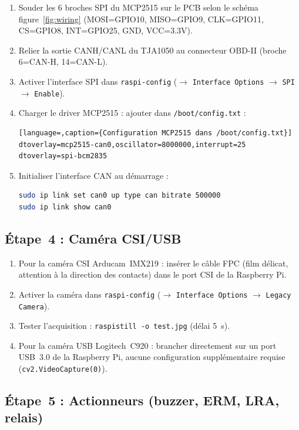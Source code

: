 \documentclass[12pt,a4paper]{report}
\begin{document}
\begin{enumerate}
  \item Souder les 6 broches SPI du MCP2515 sur le PCB selon le sch\'ema figure~\ref{fig:wiring} (MOSI=GPIO10, MISO=GPIO9, CLK=GPIO11, CS=GPIO8, INT=GPIO25, GND, VCC=3.3V).
  \item Relier la sortie CANH/CANL du TJA1050 au connecteur OBD-II (broche 6=CAN-H, 14=CAN-L).
  \item Activer l'interface SPI dans \texttt{raspi-config} ($\rightarrow$ \texttt{Interface Options} $\rightarrow$ \texttt{SPI} $\rightarrow$ \texttt{Enable}).
  \item Charger le driver MCP2515 : ajouter dans \texttt{/boot/config.txt} :
\begin{lstlisting}[language=,caption={Configuration MCP2515 dans /boot/config.txt}]
dtoverlay=mcp2515-can0,oscillator=8000000,interrupt=25
dtoverlay=spi-bcm2835
\end{lstlisting}
  \item Initialiser l'interface CAN au d\'emarrage :
\begin{lstlisting}[language=bash,caption={Initialisation du bus CAN sous Linux}]
sudo ip link set can0 up type can bitrate 500000
sudo ip link show can0
\end{lstlisting}
\end{enumerate}

\subsection{\'Etape~4 : Cam\'era CSI/USB}

\begin{enumerate}
  \item Pour la cam\'era CSI Arducam~IMX219 : ins\'erer le c\^able FPC (film d\'elicat, attention \`a la direction des contacts) dans le port CSI de la Raspberry Pi.
  \item Activer la cam\'era dans \texttt{raspi-config} ($\rightarrow$ \texttt{Interface Options} $\rightarrow$ \texttt{Legacy Camera}).
  \item Tester l'acquisition : \texttt{raspistill -o test.jpg} (d\'elai 5~s).
  \item Pour la cam\'era USB Logitech~C920 : brancher directement sur un port USB~3.0 de la Raspberry Pi, aucune configuration suppl\'ementaire requise (\texttt{cv2.VideoCapture(0)}).
\end{enumerate}

\subsection{\'Etape~5 : Actionneurs (buzzer, ERM, LRA, relais)}
\end{document}
